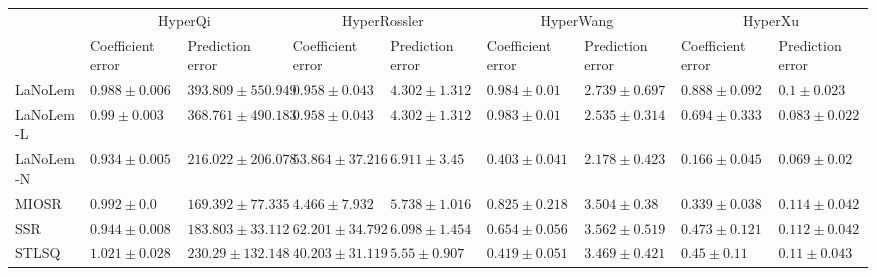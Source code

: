 \begin{table*}
{\begin{tabular}{lllllllll}
 & \multicolumn{2}{c}{HyperQi} & \multicolumn{2}{c}{HyperRossler} & \multicolumn{2}{c}{HyperWang} & \multicolumn{2}{c}{HyperXu} \\
 & Coefficient error & Prediction error & Coefficient error & Prediction error & Coefficient error & Prediction error & Coefficient error & Prediction error \\
\midrule
LaNoLem & $0.988\pm 0.006$ & $393.809\pm 550.949$ & $\mathbf{0.958}\pm 0.043$ & $\mathbf{4.302}\pm 1.312$ & $0.984\pm 0.01$ & $2.739\pm 0.697$ & $0.888\pm 0.092$ & $0.1\pm 0.023$ \\
LaNoLem-L & $0.99\pm 0.003$ & $368.761\pm 490.183$ & $\mathbf{0.958}\pm 0.043$ & $\mathbf{4.302}\pm 1.312$ & $0.983\pm 0.01$ & $2.535\pm 0.314$ & $0.694\pm 0.333$ & $0.083\pm 0.022$ \\
LaNoLem-N & $\mathbf{0.934}\pm 0.005$ & $216.022\pm 206.078$ & $53.864\pm 37.216$ & $6.911\pm 3.45$ & $\mathbf{0.403}\pm 0.041$ & $\mathbf{2.178}\pm 0.423$ & $\mathbf{0.166}\pm 0.045$ & $\mathbf{0.069}\pm 0.02$ \\
MIOSR & $0.992\pm 0.0$ & $\mathbf{169.392}\pm 77.335$ & $4.466\pm 7.932$ & $5.738\pm 1.016$ & $0.825\pm 0.218$ & $3.504\pm 0.38$ & $0.339\pm 0.038$ & $0.114\pm 0.042$ \\
SSR & $0.944\pm 0.008$ & $183.803\pm 33.112$ & $62.201\pm 34.792$ & $6.098\pm 1.454$ & $0.654\pm 0.056$ & $3.562\pm 0.519$ & $0.473\pm 0.121$ & $0.112\pm 0.042$ \\
STLSQ & $1.021\pm 0.028$ & $230.29\pm 132.148$ & $40.203\pm 31.119$ & $5.55\pm 0.907$ & $0.419\pm 0.051$ & $3.469\pm 0.421$ & $0.45\pm 0.11$ & $0.11\pm 0.043$ \\

\midrule


\end{tabular}}
\end{table*}
